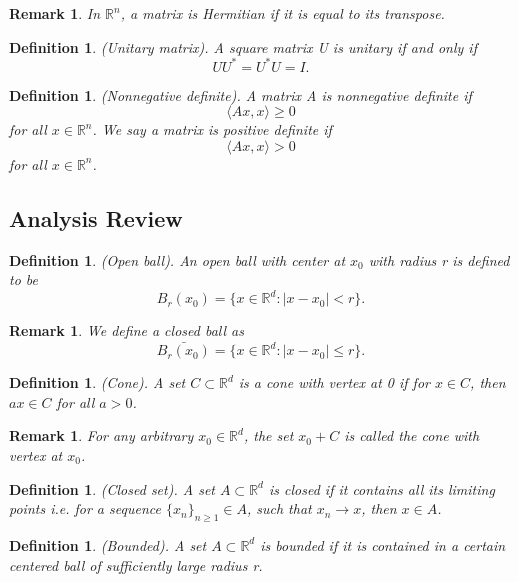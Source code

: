 \documentclass[twoside]{article}
\newtheorem{remark}[theorem]{Remark}
\newtheorem{definition}[theorem]{Definition}
\begin{document}
\begin{remark}In $\mathbb{R}^n$, a matrix is Hermitian if it is equal to its transpose.
\end{remark}

\begin{definition}(Unitary matrix). A square matrix U is unitary if and only if 
$$
UU^* = U^*U = I.
$$
\end{definition}

\begin{definition}(Nonnegative definite). A matrix A is nonnegative definite if 
$$
\langle Ax, x \rangle \geq 0
$$
for all $x \in \mathbb{R}^n$. We say a matrix is positive definite if 
$$
\langle Ax, x \rangle > 0
$$
for all $x \in \mathbb{R}^n$.
\end{definition}



\subsection{Analysis Review}

\begin{definition}(Open ball). An open ball with center at $x_0$ with radius r is defined to be
$$
B_r(x_0) = \{x \in \mathbb{R}^d: |x - x_0| < r \}.
$$
\end{definition}

\begin{remark} We define a closed ball as 
$$
\bar{B_r(x_0)} = \{x \in \mathbb{R}^d: |x - x_0| \leq r \}.
$$
\end{remark}

\begin{definition}(Cone). A set $C \subset \mathbb{R}^d$ is a cone with vertex at 0 if for $x \in C$, then $ax \in C$ for all $a > 0$.
\end{definition}

\begin{remark} For any arbitrary $x_0 \in \mathbb{R}^d$, the set $x_0 + C$ is called the cone with vertex at $x_0$.
\end{remark}

\begin{definition}(Closed set). A set $A \subset \mathbb{R}^d$ is closed if it contains all its limiting points i.e. for a sequence $\{x_n\}_{n \geq 1} \in A$, such that $x_n \rightarrow x$, then $x \in A$.
\end{definition}

\begin{definition}(Bounded). A set $A \subset \mathbb{R}^d$ is bounded if it is contained in a certain centered ball of sufficiently large radius r.
\end{definition}
\end{document}
